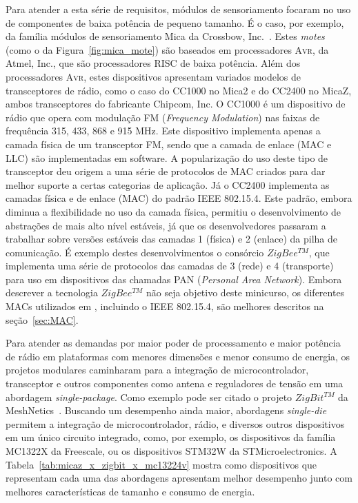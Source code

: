 \begin{itemize}
\end{itemize}

Para atender a esta série de requisitos, módulos de sensoriamento focaram no uso
de componentes de baixa potência de pequeno tamanho. É o caso, por exemplo, da
família módulos de sensoriamento Mica da Crossbow, Inc.~\cite{Crossbow:MTS:2005}.
Estes \emph{motes} (como o da Figura~\ref{fig:mica_mote}) são baseados em
processadores \textsc{Avr}, da Atmel, Inc., que são processadores RISC de baixa
potência. Além dos processadores \textsc{Avr}, estes dispositivos apresentam
variados modelos de transceptores de rádio, como o caso do CC1000 no Mica2 e do
CC2400 no MicaZ, ambos transceptores do fabricante Chipcom, Inc. O CC1000 é um
dispositivo de rádio que opera com modulação FM (\textit{Frequency Modulation})
nas faixas de frequência 315, 433, 868 e 915 MHz. Este dispositivo implementa
apenas a camada física de um transceptor FM, sendo que a camada de enlace (MAC e
LLC) são implementadas em software. A popularização do uso deste tipo de
transceptor deu origem a uma série de protocolos de MAC criados para dar melhor
suporte a certas categorias de aplicação. Já o CC2400 implementa as camadas
física e de enlace (MAC) do padrão IEEE 802.15.4. Este padrão, embora diminua a
flexibilidade no uso da camada física, permitiu o desenvolvimento de abstrações
de mais alto nível estáveis, já que os desenvolvedores passaram a trabalhar
sobre versões estáveis das camadas 1 (física) e 2 (enlace) da pilha de
comunicação. É exemplo destes desenvolvimentos o consórcio $ZigBee^{TM}$, que
implementa uma série de protocolos das camadas de 3 (rede) e 4 (transporte) para
uso em dispositivos das chamadas PAN (\textit{Personal Area Network}). Embora
descrever a tecnologia $ZigBee^{TM}$ não seja objetivo deste minicurso, os
diferentes MACs utilizados em \rssf, incluindo o IEEE 802.15.4, são melhores
descritos na seção~\ref{sec:MAC}.



Para atender as demandas por maior poder de processamento e maior potência de
rádio em plataformas com menores dimensões e menor consumo de energia, os
projetos modulares caminharam para a integração de microcontrolador, transceptor
e outros componentes como antena e reguladores de tensão em uma abordagem
\emph{single-package}. Como exemplo pode ser citado o projeto $ZigBit^{TM}$ da
MeshNetics~\cite{Meshnetics:ZigBit:2007}. Buscando um desempenho ainda maior,
abordagens \emph{single-die} permitem a integração de microcontrolador, rádio, e
diversos outros dispositivos em um único circuito integrado, como, por exemplo,
os dispositivos da família MC1322X da Freescale, ou os dispositivos STM32W da
STMicroelectronics. A Tabela~\ref{tab:micaz_x_zigbit_x_mc13224v} mostra como
dispositivos que representam cada uma das abordagens apresentam melhor
desempenho junto com melhores características de tamanho e consumo de energia.

